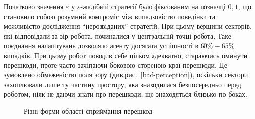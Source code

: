 \documentclass[a4paper,10pt,fleqn]{article}
\begin{document}
Початково значення $\varepsilon$ у $\varepsilon$-жадібній стратегії було фіксованим на позначці $0,1$, що становило собою розумний компроміс між випадковістю поведінки та можливістю дослідження ``нерозвіданих'' стратегій. При цьому вершини секторів, які відповідали за зір робота, починалися у центральній точці робота. Таке поєднання налаштувань дозволяло агенту досягати успішності в $60\%-65\%$ випадків. При цьому робот поводив себе цілком адекватно, стараючись оминути перешкоди, проте часто зачіпаючи боковою стороною краї перешкоди. Це зумовлено обмеженістю поля зору (див.рис.~\ref{bad-perception}), оскільки сектори захоплювали лише ту частину простору, яка знаходилася безпосередньо перед роботом, ніяк не даючи знати про перешкоди, що знаходяться близько по боках.

\begin{figure}
	\centering
	\;
	\caption{Різні форми області сприймання перешкод}
	\label{fig:bad-and-good-perception}
\end{figure}
\end{document}
